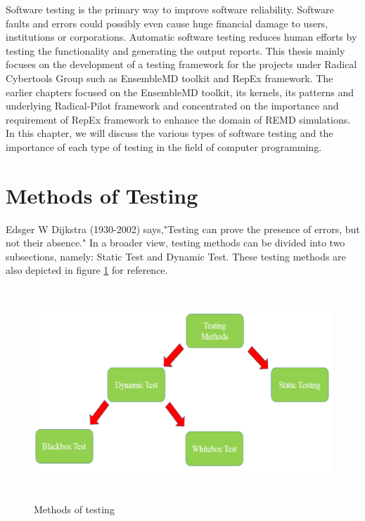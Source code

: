 \documentclass[10pt]{ruthesis}
\begin{document}
Software testing is the primary way to improve software reliability. Software faults and errors could possibly even cause huge financial damage to users, institutions or corporations. Automatic software testing reduces human efforts by testing the functionality and generating the output reports. This thesis mainly focuses on the development of a testing framework for the projects under Radical Cybertools Group such as EnsembleMD toolkit and RepEx framework. The earlier chapters focused on the EnsembleMD toolkit, its kernels, its patterns and underlying Radical-Pilot framework and concentrated on the importance and requirement of RepEx framework to enhance the domain of REMD simulations. In this chapter, we will discuss the various types of software testing and the importance of each type of testing in the field of computer programming.

\section{Methods of Testing}

Edsger W Dijkstra (1930-2002) says,"Testing can prove the presence of errors, but not their absence." In a broader view, testing methods can be divided into two subsections, namely: Static Test and Dynamic Test. These testing methods are also depicted in figure \ref{fig:test_met} for reference.

\begin{figure}
  \centering
  \includegraphics[width=17cm,height=8cm]{test_method.png}
  \caption{Methods of testing}
  \label{fig:test_met}
\end{figure}
\end{document}
